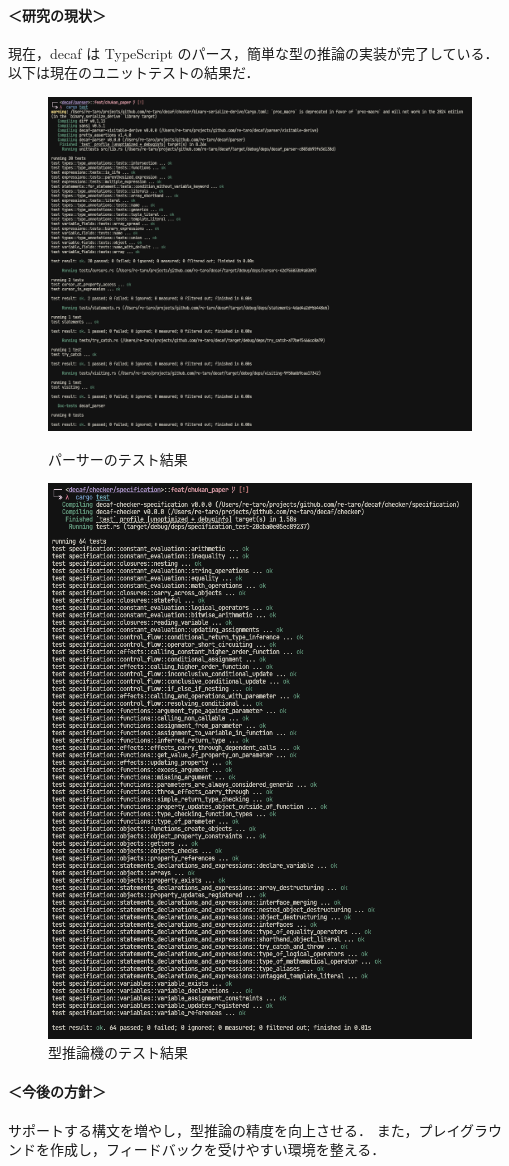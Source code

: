 \documentclass[dvipdfmx]{classes/tyukan}
\begin{document}
\paragraph{＜研究の現状＞}
現在，decaf は TypeScript のパース，簡単な型の推論の実装が完了している．
以下は現在のユニットテストの結果だ．
\begin{figure}[h]
  \centering
  \begin{minipage}[b]{0.49\columnwidth}
      \centering
      \includegraphics[width=0.85\columnwidth]{figures/parser_unit.png}
      \caption{パーサーのテスト結果}
      \label{fig:a}
  \end{minipage}
  \begin{minipage}[b]{0.49\columnwidth}
      \centering
      \includegraphics[width=0.85\columnwidth]{figures/chekcer_unit.png}
      \caption{型推論機のテスト結果}
      \label{fig:b}
  \end{minipage}
\end{figure}

\paragraph{＜今後の方針＞}
サポートする構文を増やし，型推論の精度を向上させる．
また，プレイグラウンドを作成し，フィードバックを受けやすい環境を整える．
\end{document}
